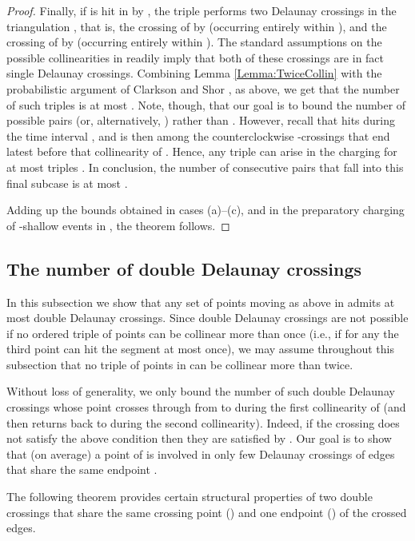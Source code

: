 \documentclass[letter,11pt]{article}
\begin{document}
\begin{proof}
Finally, if  is hit in  by , the triple  performs two Delaunay crossings in the triangulation , that is, the crossing of  by  (occurring entirely within ), and the crossing of  by  (occurring entirely within ). The standard assumptions on the possible collinearities in  readily imply that both of these crossings are in fact single Delaunay crossings.
Combining Lemma \ref{Lemma:TwiceCollin} with the probabilistic argument of Clarkson and Shor \cite{CS}, as above, we get that the number of such triples  is at most . Note, though, that our goal is to bound the number of possible pairs  (or, alternatively, ) rather than . However, recall that  hits  during the time interval , and  is then among the  counterclockwise -crossings that end latest before that collinearity of . Hence, any triple  can arise in the charging for at most  triples . In conclusion, the number of consecutive pairs  that fall into this final subcase is at most . 

Adding up the bounds obtained in cases (a)--(c),  and in the preparatory charging of -shallow events in , the theorem follows.
\end{proof}

\subsection{The number of double Delaunay crossings}\label{Subsec:Double}
In this subsection we show that any set  of  points moving as above in  admits at most  double Delaunay crossings.
Since double Delaunay crossings are not possible if no ordered triple of points can be collinear more than once
(i.e., if for any  the third point  can hit the segment  at most once), we may assume throughout this subsection that no triple of points in  can be collinear more than twice.

Without loss of generality, we only bound the number of such double Delaunay crossings  whose point  crosses through  from  to  during the first collinearity of  (and then returns back to  during the second collinearity).
Indeed, if the crossing  does not satisfy the above condition then they are satisfied by .
Our goal is to show that (on average) a point  of  is involved in only few Delaunay crossings of edges that share the same endpoint .


The following theorem provides certain structural properties of two double crossings that share the same crossing point () and one endpoint () of the crossed edges.
\end{document}
